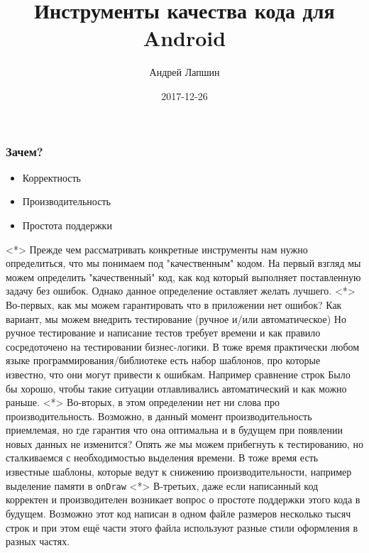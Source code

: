 \documentclass{beamer}
\author{Андрей Лапшин}
\date{2017-12-26}
\title{Инструменты качества кода для Android}
\begin{document}
\begin{frame}
    \titlepage
\end{frame}

\begin{frame}
    \frametitle{Зачем?}
    \begin{itemize}
        \item{Корректность}
        \item{Производительность}
        \item{Простота поддержки}
    \end{itemize}
    \note<*>{
        Прежде чем рассматривать конкретные инструменты нам нужно определиться,
        что мы понимаем под "качественным" кодом. На первый взгляд мы можем определить
        "качественный" код, как код который выполняет поставленную задачу без ошибок.
        Однако данное определение оставляет желать лучшего.
    }
    \note<*>{
        Во-первых, как мы можем гарантировать что в приложении нет ошибок?
        Как вариант, мы можем внедрить тестирование (ручное и/или автоматическое)
        Но ручное тестирование и написание тестов требует времени и как правило
        сосредоточено на тестировании бизнес-логики. В тоже время практически
        любом языке программирования/библиотеке есть набор шаблонов, про которые
        известно, что они могут привести к ошибкам. Например сравнение строк
        Было бы хорошо, чтобы такие ситуации отлавливались автоматический и как можно раньше.
    }
    \note<*>{
        Во-вторых, в этом определении нет ни слова про производительность.
        Возможно, в данный момент производительность приемлемая, но где гарантия
        что она оптимальна и в будущем при появлении новых данных не изменится?
        Опять же мы можем прибегнуть к тестированию, но сталкиваемся с необходимостью
        выделения времени. В тоже время есть известные шаблоны, которые ведут
        к снижению производительности, например выделение памяти в \texttt{onDraw}
    }
    \note<*>{
        В-третьих, даже если написанный код корректен и производителен возникает
        вопрос о простоте поддержки этого кода в будущем. Возможно этот код
        написан в одном файле размеров несколько тысяч строк и при этом ещё
        части этого файла используют разные стили оформления в разных частях.
    }
\end{frame}
\end{document}
